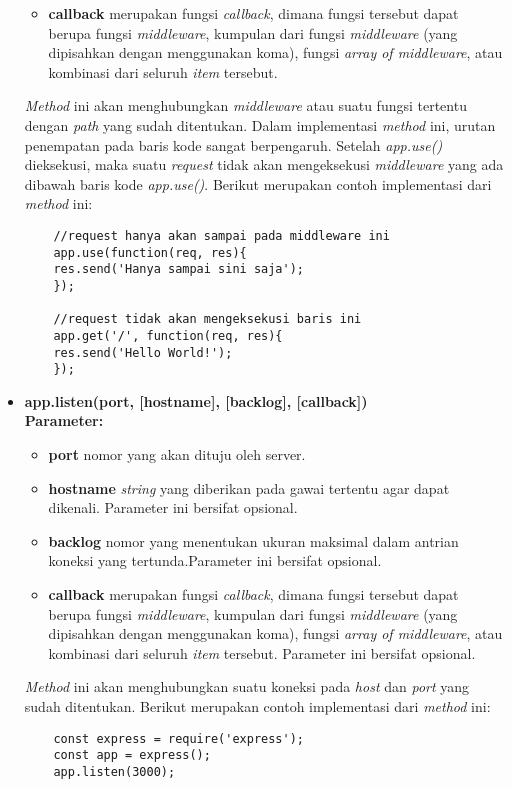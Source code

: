 \begin{itemize}
\begin{itemize}
		\item \textbf{callback} merupakan fungsi \textit{callback}, dimana fungsi tersebut dapat berupa fungsi \textit{middleware}, kumpulan dari fungsi \textit{middleware} (yang dipisahkan dengan menggunakan koma), fungsi \textit{array of middleware}, atau kombinasi dari seluruh \textit{item} tersebut.
	\end{itemize}
	
	\textit{Method} ini akan menghubungkan \textit{middleware} atau suatu fungsi tertentu dengan \textit{path} yang sudah ditentukan. Dalam implementasi \textit{method} ini, urutan penempatan pada baris kode sangat berpengaruh. Setelah \textit{app.use()} dieksekusi, maka suatu \textit{request} tidak akan mengeksekusi \textit{middleware} yang ada dibawah baris kode \textit{app.use()}.  Berikut merupakan contoh implementasi dari \textit{method} ini:
	\begin{lstlisting}
	//request hanya akan sampai pada middleware ini
	app.use(function(req, res){
	res.send('Hanya sampai sini saja');
	});
	
	//request tidak akan mengeksekusi baris ini
	app.get('/', function(req, res){
	res.send('Hello World!');
	});
	\end{lstlisting}
	
	\item \textbf{app.listen(port, [hostname], [backlog], [callback])} \\ \textbf{Parameter:}
	\begin{itemize}
		\item \textbf{port} nomor yang akan dituju oleh server.
		\item \textbf{hostname} \textit{string} yang diberikan pada gawai tertentu agar dapat dikenali. Parameter ini bersifat opsional.
		\item \textbf{backlog} nomor yang menentukan ukuran maksimal dalam antrian koneksi yang tertunda.Parameter ini bersifat opsional.
		\item \textbf{callback} merupakan fungsi \textit{callback}, dimana fungsi tersebut dapat berupa fungsi \textit{middleware}, kumpulan dari fungsi \textit{middleware} (yang dipisahkan dengan menggunakan koma), fungsi \textit{array of middleware}, atau kombinasi dari seluruh \textit{item} tersebut. Parameter ini bersifat opsional.
	\end{itemize}
	
	\textit{Method} ini akan menghubungkan suatu koneksi pada \textit{host} dan \textit{port} yang sudah ditentukan. Berikut merupakan contoh implementasi dari \textit{method} ini:
	\begin{lstlisting}
	const express = require('express');
	const app = express();
	app.listen(3000);
	\end{lstlisting}
	
\end{itemize}

